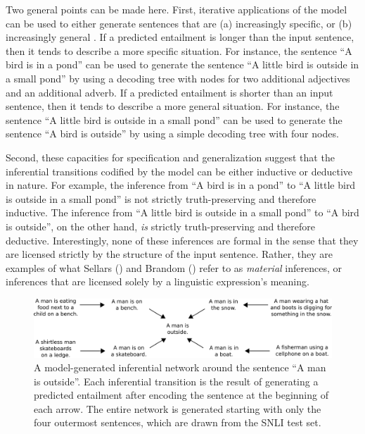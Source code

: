 Two general points can be made here. First, iterative applications of the model can be used to either generate sentences that are (a) increasingly specific, or (b) increasingly general \citep{Kolesnyk:2016}. If a predicted entailment is longer than the input sentence, then it tends to describe a more specific situation. For instance, the sentence ``A bird is in a pond'' can be used to generate the sentence ``A little bird is outside in a small pond'' by using a decoding tree with nodes for two additional adjectives and an additional adverb. If a predicted entailment is shorter than an input sentence, then it tends to describe a more general situation. For instance, the sentence ``A little bird is outside in a small pond'' can be used to generate the sentence ``A bird is outside'' by using a simple decoding tree with four nodes. 

Second, these capacities for specification and generalization suggest that the inferential transitions codified by the model can be either inductive or deductive in nature. For example, the inference from ``A bird is in a pond'' to ``A little bird is outside in a small pond'' is not strictly truth-preserving and therefore inductive. The inference from ``A little bird is outside in a small pond'' to ``A bird is outside'', on the other hand, \textit{is} strictly truth-preserving and therefore deductive. Interestingly, none of these inferences are formal in the sense that they are licensed strictly by the structure of the input sentence. Rather, they are examples of what Sellars (\citeyear{Sellars:1954}) and Brandom (\citeyear{Brandom:1994}) refer to as \textit{material} inferences, or inferences that are licensed solely by a linguistic expression's meaning. 

\begin{figure}[t]
\begin{center}
\includegraphics[width=6in]{figures/chain.png}
\end{center}
\caption{A model-generated inferential network around the sentence ``A man is outside''. Each inferential transition is the result of generating a predicted entailment after encoding the sentence at the beginning of each arrow. The entire network is generated starting with only the four outermost sentences, which are drawn from the SNLI test set.} 
\label{chain}
\end{figure}

